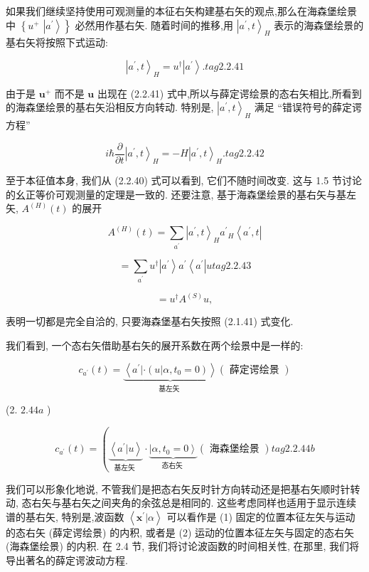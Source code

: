 \documentclass[lang=cn,newtx,10pt,scheme=chinese,thmcnt=section]{elegantbook}
\begin{document}
如果我们继续坚持使用可观测量的本征右矢构建基右矢的观点,那么在海森堡绘景中 $\left\{ {u}^{ + }\right.$ $\left. \left| {a}^{\prime }\right\rangle \right\}$ 必然用作基右矢. 随着时间的推移,用 ${\left| {a}^{\prime }, t\right\rangle }_{H}$ 表示的海森堡绘景的基右矢将按照下式运动:

$$
{\left| {a}^{\prime }, t\right\rangle }_{H} = {u}^{ \dagger }\left| {a}^{\prime }\right\rangle . tag{2.2.41}
$$

由于是 ${\mathbf{u}}^{ + }$ 而不是 $\mathbf{u}$ 出现在 (2.2.41) 式中,所以与薛定谔绘景的态右矢相比,所看到的海森堡绘景的基右矢沿相反方向转动. 特别是, ${\left| {a}^{\prime }, t\right\rangle }_{H}$ 满足 “错误符号的薛定谔方程”

$$
i\hbar \frac{\partial }{\partial t}{\left| {a}^{\prime }, t\right\rangle }_{H} = - H{\left| {a}^{\prime }, t\right\rangle }_{H}. tag{2.2.42}
$$

至于本征值本身, 我们从 (2.2.40) 式可以看到, 它们不随时间改变. 这与 1.5 节讨论的幺正等价可观测量的定理是一致的. 还要注意, 基于海森堡绘景的基右矢与基左矢, ${A}^{\left( H\right) }\left( t\right)$ 的展开

$$
{A}^{\left( H\right) }\left( t\right) = \mathop{\sum }\limits_{{a}^{\prime }}{\left| {a}^{\prime }, t\right\rangle }_{H}{a}^{\prime }{}_{H}\left\langle {{a}^{\prime }, t}\right|
$$

$$
= \mathop{\sum }\limits_{{a}^{\prime }}{u}^{ \dagger }\left| {a}^{\prime }\right\rangle {a}^{\prime }\left\langle {a}^{\prime }\right| u tag{2. 2.43}
$$

$$
= {u}^{ \dagger }{A}^{\left( S\right) }u,
$$

表明一切都是完全自洽的, 只要海森堡基右矢按照 (2.1.41) 式变化.

我们看到, 一个态右矢借助基右矢的展开系数在两个绘景中是一样的:

$$
{c}_{{a}^{\prime }}\left( t\right) = \underset{\text{基左矢 }}{\underbrace{\left\langle {a}^{\prime } | \cdot \left( u | \alpha ,{t}_{0} = 0\right) \right\rangle }}\left( \text{ 薛定谔绘景 }\right)
$$

(2. ${2.44a}$ )

$$
{c}_{{a}^{\prime }}\left( t\right) = \left( {\underset{\text{基左矢 }}{\underbrace{\left\langle {a}^{\prime } | u\right\rangle }} \cdot \underset{\text{态右矢 }}{\underbrace{\left| \alpha ,{t}_{0} = 0\right\rangle }}\left( \text{ 海森堡绘景 }\right) }\right. tag{2. 2.44b}
$$

我们可以形象化地说, 不管我们是把态右矢反时针方向转动还是把基右矢顺时针转动, 态右矢与基右矢之间夹角的余弦总是相同的. 这些考虑同样也适用于显示连续谱的基右矢, 特别是,波函数 $\left\langle {{\mathbf{x}}^{\prime } | \alpha }\right\rangle$ 可以看作是 (1) 固定的位置本征左矢与运动的态右矢 (薛定谔绘景) 的内积, 或者是 (2) 运动的位置本征左矢与固定的态右矢 (海森堡绘景) 的内积. 在 2.4 节, 我们将讨论波函数的时间相关性, 在那里, 我们将导出著名的薛定谔波动方程.
\end{document}
